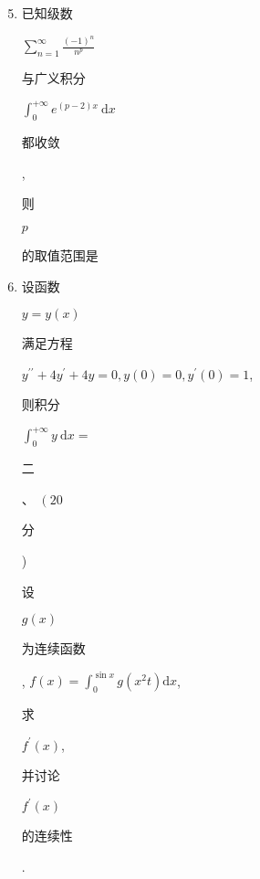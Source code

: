 \documentclass[10pt]{article}
\begin{document}
\begin{enumerate}
  \setcounter{enumi}{4}
  \item \begin{CJK}{UTF8}{mj}已知级数\end{CJK} $\sum_{n=1}^{\infty} \frac{(-1)^{n}}{n^{p}}$ \begin{CJK}{UTF8}{mj}与广义积分\end{CJK} $\int_{0}^{+\infty} e^{(p-2) x} \mathrm{~d} x$ \begin{CJK}{UTF8}{mj}都收敛\end{CJK}, \begin{CJK}{UTF8}{mj}则\end{CJK} $p$ \begin{CJK}{UTF8}{mj}的取值范围是\end{CJK}

  \item \begin{CJK}{UTF8}{mj}设函数\end{CJK} $y=y(x)$ \begin{CJK}{UTF8}{mj}满足方程\end{CJK} $y^{\prime \prime}+4 y^{\prime}+4 y=0, y(0)=0, y^{\prime}(0)=1$, \begin{CJK}{UTF8}{mj}则积分\end{CJK} $\int_{0}^{+\infty} y \mathrm{~d} x=$ \begin{CJK}{UTF8}{mj}二\end{CJK}、 $\left(20\right.$ \begin{CJK}{UTF8}{mj}分\end{CJK}) \begin{CJK}{UTF8}{mj}设\end{CJK} $g(x)$ \begin{CJK}{UTF8}{mj}为连续函数\end{CJK}, $f(x)=\int_{0}^{\sin x} g\left(x^{2} t\right) \mathrm{d} x$, \begin{CJK}{UTF8}{mj}求\end{CJK} $f^{\prime}(x)$, \begin{CJK}{UTF8}{mj}并讨论\end{CJK} $f^{\prime}(x)$ \begin{CJK}{UTF8}{mj}的连续性\end{CJK}.

\end{enumerate}
\end{document}
